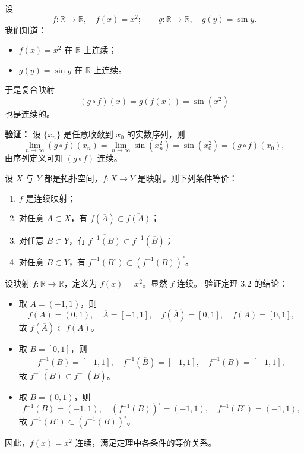 \begin{example}[复合连续映射的具体例子]
设
\[
f:\mathbb{R}\to\mathbb{R},\quad f(x)=x^2;
\qquad
g:\mathbb{R}\to\mathbb{R},\quad g(y)=\sin y.
\]
我们知道：
\begin{itemize}
  \item $f(x)=x^2$ 在 $\mathbb{R}$ 上连续；
  \item $g(y)=\sin y$ 在 $\mathbb{R}$ 上连续。
\end{itemize}
于是复合映射
\[
(g\circ f)(x)=g(f(x))=\sin(x^2)
\]
也是连续的。

\textbf{验证：}  
设 $\{x_n\}$ 是任意收敛到 $x_0$ 的实数序列，则
\[
\lim_{n\to\infty}(g\circ f)(x_n)
=\lim_{n\to\infty}\sin(x_n^2)
=\sin(x_0^2)
=(g\circ f)(x_0),
\]
由序列定义可知 $(g\circ f)$ 连续。
\end{example}
\begin{theorem}[连续映射补集逆的性质]
设 \(X\) 与 \(Y\) 都是拓扑空间，\(f:X\to Y\) 是映射。则下列条件等价：
\begin{enumerate}
  \item \(f\) 是连续映射；
  \item 对任意 \(A\subset X\)，有 \(f(\overline{A})\subset \overline{f(A)}\)；
  \item 对任意 \(B\subset Y\)，有 \(\overline{f^{-1}(B)}\subset f^{-1}(\overline{B})\)；
  \item 对任意 \(B\subset Y\)，有 \(f^{-1}(B^{\circ})\subset (f^{-1}(B))^{\circ}\)。
\end{enumerate}
\end{theorem}
\begin{example}
设映射 $f:\mathbb{R}\to\mathbb{R}$，定义为 $f(x)=x^2$。显然 $f$ 连续。  
验证定理 3.2 的结论：

\begin{itemize}
  \item 取 $A=(-1,1)$，则
  \[
  f(A)=(0,1),\quad \overline{A}=[-1,1],\quad f(\overline{A})=[0,1],\quad \overline{f(A)}=[0,1],
  \]
  故 $f(\overline{A})\subset\overline{f(A)}$。

  \item 取 $B=[0,1]$，则
  \[
  f^{-1}(B)=[-1,1],\quad f^{-1}(\overline{B})=[-1,1],\quad \overline{f^{-1}(B)}=[-1,1],
  \]
  故 $\overline{f^{-1}(B)}\subset f^{-1}(\overline{B})$。

  \item 取 $B=(0,1)$，则
  \[
  f^{-1}(B)=(-1,1),\quad (f^{-1}(B))^\circ=(-1,1),\quad f^{-1}(B^\circ)=(-1,1),
  \]
  故 $f^{-1}(B^\circ)\subset (f^{-1}(B))^\circ$。
\end{itemize}

因此，$f(x)=x^2$ 连续，满足定理中各条件的等价关系。
\end{example}
